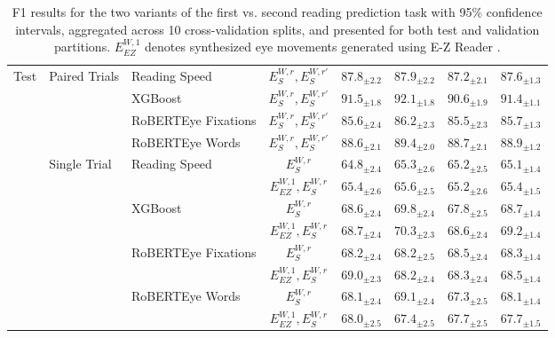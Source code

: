 \begin{table*}[ht]
{\begin{tabular}{lllc cccc}
\multirow{12}{*}{Test} & \multirow{4}{*}{Paired Trials} & 
Reading Speed & $E_S^{W,r}, E_S^{W,r'}$ & $87.8_{\pm2.2}$ & $87.9_{\pm2.2}$ & $87.2_{\pm2.1}$ & $87.6_{\pm1.3}$ \\ 
 &  & XGBoost & $E_S^{W,r}, E_S^{W,r'}$ & $91.5_{\pm1.8}$ & $92.1_{\pm1.8}$ & $90.6_{\pm1.9}$ & $91.4_{\pm1.1}$ \\ 
 &  & RoBERTEye Fixations & $E_S^{W,r}, E_S^{W,r'}$ & $85.6_{\pm2.4}$ & $86.2_{\pm2.3}$ & $85.5_{\pm2.3}$ & $85.7_{\pm1.3}$ \\ 
 &  & RoBERTEye Words & $E_S^{W,r}, E_S^{W,r'}$ & $88.6_{\pm2.1}$ & $89.4_{\pm2.0}$ & $88.7_{\pm2.1}$ & $88.9_{\pm1.2}$ \\ \cmidrule{2-8}
 & \multirow{8}{*}{Single Trial} & \multirow{2}{*}{Reading Speed} & $E_S^{W,r}$ & $64.8_{\pm2.4}$ & $65.3_{\pm2.6}$ & $65.2_{\pm2.5}$ & $65.1_{\pm1.4}$ \\ 
 &  &  & $E_{EZ}^{W,1}, E_S^{W,r}$ & $65.4_{\pm2.6}$ & $65.6_{\pm2.5}$ & $65.2_{\pm2.6}$ & $65.4_{\pm1.5}$ \\ \cmidrule{3-8} 
 &  & \multirow{2}{*}{XGBoost} & $E_S^{W,r}$ & $68.6_{\pm2.4}$ & $69.8_{\pm2.4}$ & $67.8_{\pm2.5}$ & $68.7_{\pm1.4}$ \\ 
 &  &  & $E_{EZ}^{W,1}, E_S^{W,r}$ & $68.7_{\pm2.4}$ & $70.3_{\pm2.3}$ & $68.6_{\pm2.4}$ & $69.2_{\pm1.4}$ \\ \cmidrule{3-8} 
 &  & \multirow{2}{*}{RoBERTEye Fixations} & $E_S^{W,r}$ & $68.2_{\pm2.4}$ & $68.2_{\pm2.5}$ & $68.5_{\pm2.4}$ & $68.3_{\pm1.4}$ \\ 
 &  &  & $E_{EZ}^{W,1}, E_S^{W,r}$ & $69.0_{\pm2.3}$ & $68.2_{\pm2.4}$ & $68.3_{\pm2.4}$ & $68.5_{\pm1.4}$ \\ \cmidrule{3-8} 
 &  & \multirow{2}{*}{RoBERTEye Words} & $E_S^{W,r}$ & $68.1_{\pm2.4}$ & $69.1_{\pm2.4}$ & $67.3_{\pm2.5}$ & $68.1_{\pm1.4}$ \\ 
 &  &  & $E_{EZ}^{W,1}, E_S^{W,r}$ & $68.0_{\pm2.5}$ & $67.4_{\pm2.5}$ & $67.7_{\pm2.5}$ & $67.7_{\pm1.5}$ \\ 
\bottomrule
\end{tabular}%
}
\caption{F1 results for the two variants of the first vs. second reading prediction task with 95\% confidence intervals, aggregated across 10 cross-validation splits, and presented for both test and validation partitions. $E_{EZ}^{W,1}$ denotes synthesized eye movements generated using \mbox{E-Z} Reader \cite{reichle2003ez}.}
\label{app:tab:f1_scores}
\end{table*}


